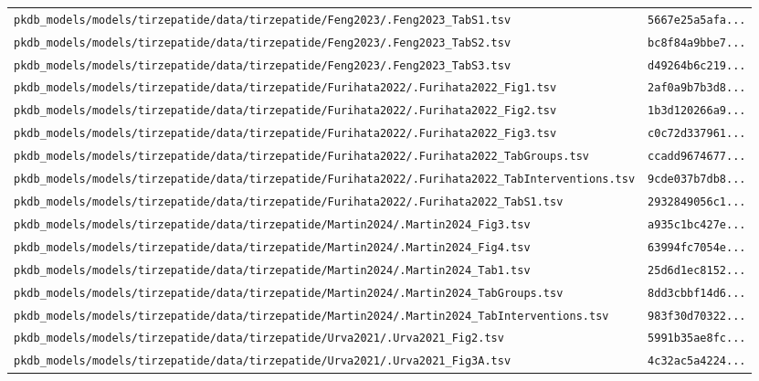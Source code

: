 \documentclass{article}
\begin{document}
\begin{longtable}{ll}
\texttt{pkdb\_models/models/tirzepatide/data/tirzepatide/Feng2023/.Feng2023\_TabS1.tsv} & \texttt{5667e25a5afa...} \\
\texttt{pkdb\_models/models/tirzepatide/data/tirzepatide/Feng2023/.Feng2023\_TabS2.tsv} & \texttt{bc8f84a9bbe7...} \\
\texttt{pkdb\_models/models/tirzepatide/data/tirzepatide/Feng2023/.Feng2023\_TabS3.tsv} & \texttt{d49264b6c219...} \\
\texttt{pkdb\_models/models/tirzepatide/data/tirzepatide/Furihata2022/.Furihata2022\_Fig1.tsv} & \texttt{2af0a9b7b3d8...} \\
\texttt{pkdb\_models/models/tirzepatide/data/tirzepatide/Furihata2022/.Furihata2022\_Fig2.tsv} & \texttt{1b3d120266a9...} \\
\texttt{pkdb\_models/models/tirzepatide/data/tirzepatide/Furihata2022/.Furihata2022\_Fig3.tsv} & \texttt{c0c72d337961...} \\
\texttt{pkdb\_models/models/tirzepatide/data/tirzepatide/Furihata2022/.Furihata2022\_TabGroups.tsv} & \texttt{ccadd9674677...} \\
\texttt{pkdb\_models/models/tirzepatide/data/tirzepatide/Furihata2022/.Furihata2022\_TabInterventions.tsv} & \texttt{9cde037b7db8...} \\
\texttt{pkdb\_models/models/tirzepatide/data/tirzepatide/Furihata2022/.Furihata2022\_TabS1.tsv} & \texttt{2932849056c1...} \\
\texttt{pkdb\_models/models/tirzepatide/data/tirzepatide/Martin2024/.Martin2024\_Fig3.tsv} & \texttt{a935c1bc427e...} \\
\texttt{pkdb\_models/models/tirzepatide/data/tirzepatide/Martin2024/.Martin2024\_Fig4.tsv} & \texttt{63994fc7054e...} \\
\texttt{pkdb\_models/models/tirzepatide/data/tirzepatide/Martin2024/.Martin2024\_Tab1.tsv} & \texttt{25d6d1ec8152...} \\
\texttt{pkdb\_models/models/tirzepatide/data/tirzepatide/Martin2024/.Martin2024\_TabGroups.tsv} & \texttt{8dd3cbbf14d6...} \\
\texttt{pkdb\_models/models/tirzepatide/data/tirzepatide/Martin2024/.Martin2024\_TabInterventions.tsv} & \texttt{983f30d70322...} \\
\texttt{pkdb\_models/models/tirzepatide/data/tirzepatide/Urva2021/.Urva2021\_Fig2.tsv} & \texttt{5991b35ae8fc...} \\
\texttt{pkdb\_models/models/tirzepatide/data/tirzepatide/Urva2021/.Urva2021\_Fig3A.tsv} & \texttt{4c32ac5a4224...} \\

\end{longtable}
\end{document}
